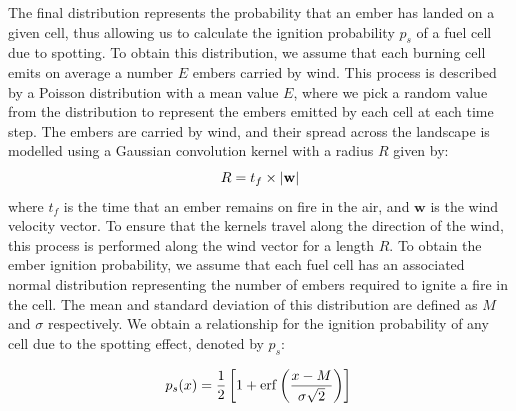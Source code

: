 \noindent  The final distribution represents the probability that an ember has landed on a given cell, thus allowing us to calculate the ignition probability $p_s$ of a fuel cell due to spotting. To obtain this distribution, we assume that each burning cell emits on average a number $E$ embers carried by wind. This process is described by a  Poisson distribution with a mean value $E$, where we pick a random value from the distribution to represent the embers emitted by each cell at each time step. The embers are carried by wind, and their spread across the landscape is modelled using a Gaussian convolution kernel with a radius $R$ given by:
\begin{equation}\label{convolution}
    R = t_{f}\times \abs{\mathbf{w}}
\end{equation}
where $t_f$ is the time that an ember remains on fire in the air, and $\mathbf{w}$ is the wind velocity vector. To ensure that the kernels travel along the direction of the wind, this process is performed along the wind vector for a length $R$. To obtain the ember ignition probability, we assume that each fuel cell has an associated normal distribution representing the number of embers required to ignite a fire in the cell. The mean and standard deviation of this distribution are defined as $M$ and $\sigma$ respectively. We obtain a relationship for the ignition probability of any cell due to the spotting effect, denoted by $p_s$:

\begin{equation}\label{p_spotting}
    p_s(x) = \frac{1}{2}\left[1 + \erf\left(\frac{x-M}{\sigma \sqrt{2}}\right)\right]\\
\end{equation}

